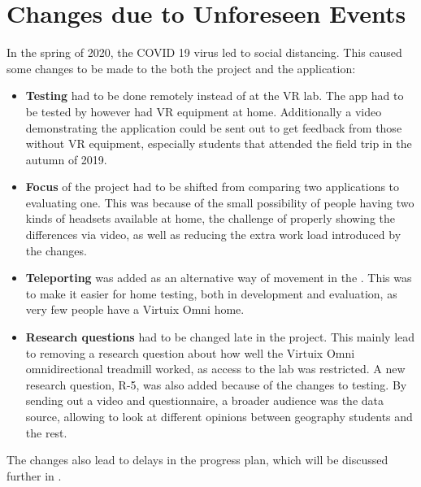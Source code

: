 \section{Changes due to Unforeseen Events}
    In the spring of 2020, the COVID 19 virus led to social distancing. This caused some changes to be made to the both the project and the application:
    
    \begin{itemize}
        \item \textbf{Testing} had to be done remotely instead of at the VR lab. The app had to be tested by however had VR equipment at home. Additionally a video demonstrating the application could be sent out to get feedback from those without VR equipment, especially students that attended the field trip in the autumn of 2019.
        
        \item \textbf{Focus} of the project had to be shifted from comparing two applications to evaluating one. This was because of the small possibility of people having two kinds of headsets available at home, the challenge of properly showing the differences via video, as well as reducing the extra work load introduced by the changes.
        
        
        \item \textbf{Teleporting} was added as an alternative way of movement in the \ApplicationName. This was to make it easier for home testing, both in development and evaluation, as very few people have a Virtuix Omni home.
        
        \item \textbf{Research questions} had to be changed late in the project. This mainly lead to removing a research question about how well the Virtuix Omni omnidirectional treadmill worked, as access to the lab was restricted. A new research question, R-5, was also added because of the changes to testing. By sending out a video and questionnaire, a broader audience was the data source, allowing to look at different opinions between geography students and the rest.
    \end{itemize}
    
    The changes also lead to delays in the progress plan, which will be discussed further in .
    